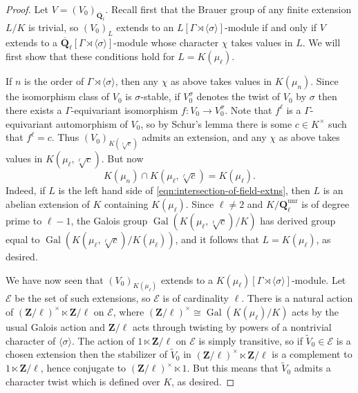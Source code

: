 \documentclass[reqno]{amsart}
\numberwithin{equation}{subsection}
\newcommand{\wt}[1]{\widetilde{#1}}
\newcommand{\Q}{\mathbf{Q}}
\newcommand{\Z}{\mathbf{Z}}
\newcommand{\Gal}{\operatorname{Gal}}
\newcommand{\ol}[1]{\overline{#1}}
\newcommand\cE{\mathcal{E}}
\DeclareMathOperator{\unr}{unr}
\theoremstyle{remark}
\numberwithin{equation}{subsection}
\numberwithin{figure}{subsection}
\begin{document}
\begin{proof}
    Let $V = (V_0)_{\ol\Q_\ell}$. Recall first that the Brauer group of any finite extension $L/K$ is trivial, so $(V_0)_L$ extends to an $L[\Gamma \rtimes \langle\sigma\rangle]$-module if and only if $V$ extends to a $\ol\Q_\ell[\Gamma \rtimes \langle\sigma\rangle]$-module whose character $\chi$ takes values in $L$. We will first show that these conditions hold for $L = K(\mu_\ell)$.
    
    If $n$ is the order of $\Gamma \rtimes \langle\sigma\rangle$, then any $\chi$ as above takes values in $K(\mu_n)$. Since the isomorphism class of $V_0$ is $\sigma$-stable, if $V_0^\sigma$ denotes the twist of $V_0$ by $\sigma$ then there exists a $\Gamma$-equivariant isomorphism $f\colon V_0 \to V_0^\sigma$. Note that $f^\ell$ is a $\Gamma$-equivariant automorphism of $V_0$, so by Schur's lemma there is some $c \in K^\times$ such that $f^\ell = c$. Thus $(V_0)_{K(\sqrt[\ell]{c})}$ admits an extension, and any $\chi$ as above takes values in $K(\mu_\ell, \sqrt[\ell]{c})$. But now
    \begin{equation}\label{eqn:intersection-of-field-extns}
    K(\mu_n) \cap K(\mu_\ell, \sqrt[\ell]{c}) = K(\mu_\ell).
    \end{equation}
    Indeed, if $L$ is the left hand side of \eqref{eqn:intersection-of-field-extns}, then $L$ is an abelian extension of $K$ containing $K(\mu_\ell)$. Since $\ell \neq 2$ and $K/\Q_\ell^{\unr}$ is of degree prime to $\ell-1$, the Galois group $\Gal(K(\mu_\ell, \sqrt[\ell]{c})/K)$ has derived group equal to $\Gal(K(\mu_\ell, \sqrt[\ell]{c})/K(\mu_\ell))$, and it follows that $L = K(\mu_\ell)$, as desired.

    We have now seen that $(V_0)_{K(\mu_\ell)}$ extends to a $K(\mu_\ell)[\Gamma \rtimes \langle\sigma\rangle]$-module. Let $\cE$ be the set of such extensions, so $\cE$ is of cardinality $\ell$. There is a natural action of $(\Z/\ell)^\times \ltimes \Z/\ell$ on $\cE$, where $(\Z/\ell)^\times \cong \Gal(K(\mu_\ell)/K)$ acts by the usual Galois action and $\Z/\ell$ acts through twisting by powers of a nontrivial character of $\langle\sigma\rangle$. The action of $1 \ltimes \Z/\ell$ on $\cE$ is simply transitive, so if $\wt V_0 \in \cE$ is a chosen extension then the stabilizer of $\wt V_0$ in $(\Z/\ell)^\times \ltimes \Z/\ell$ is a complement to $1 \ltimes \Z/\ell$, hence conjugate to $(\Z/\ell)^\times \ltimes 1$. But this means that $\wt V_0$ admits a character twist which is defined over $K$, as desired.
\end{proof}
\end{document}
